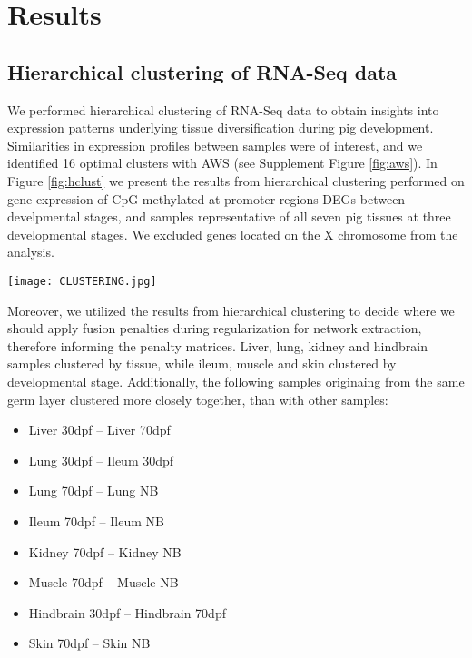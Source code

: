 \documentclass[
	a4paper, %
	10pt, %
	unnumberedsections, %
	twoside, %
]{LTJournalArticle}
\begin{document}

\section{\large Results}\label{results}
\subsection{\normalsize Hierarchical clustering of RNA-Seq data}
We performed hierarchical clustering of RNA-Seq data to obtain insights into 
expression patterns 
underlying tissue diversification during pig development. 
Similarities in expression profiles between samples were of interest, and  we 
identified 16 optimal clusters with AWS (see Supplement Figure \ref{fig:aws}). 
In Figure \ref{fig:hclust} we 
present the results from
hierarchical clustering performed on gene expression of
CpG methylated at promoter regions DEGs between
develpmental stages, and 
samples representative of all seven pig tissues at three developmental 
stages. We excluded genes
located on the X chromosome from the analysis.

\begin{figure*}[h] %
    \texttt{[image: CLUSTERING.jpg]}
    \caption{Hierarchical clustering results of TPM (Transcripts Per Million) 
	gene expression data of all samples. Genes are clustered in rows, and samples 
	are in columns. The row z-score corresponds to the fact that gene expression 
	data has been mean-centered and scaled, as $z = \frac{(y - \mu)}{sd}$. Stage 
	1 denotes 30 days post-fertilization, stage 2 denotes 70 days post-fertilization, 
	and stage 3 denotes newborn. There are four replicates for each tissue at 
	developmental stage.}
    \label{fig:hclust}
\end{figure*}
\clearpage

Moreover, we utilized the results from hierarchical clustering to decide where 
we should apply 
fusion penalties during regularization for network extraction, therefore 
informing the penalty matrices.
Liver, lung, kidney and hindbrain samples clustered by tissue, while
ileum, muscle and skin clustered 
by developmental stage. Additionally, the following
samples originaing from the same germ layer clustered more 
closely together, than with other samples: 

\begin{itemize}
    \item Liver 30dpf – Liver 70dpf
    \item Lung 30dpf – Ileum 30dpf
    \item Lung 70dpf – Lung NB
    \item Ileum 70dpf – Ileum NB
    \item Kidney 70dpf – Kidney NB
    \item Muscle 70dpf – Muscle NB
    \item Hindbrain 30dpf – Hindbrain 70dpf
    \item Skin 70dpf – Skin NB
\end{itemize}
\end{document}
